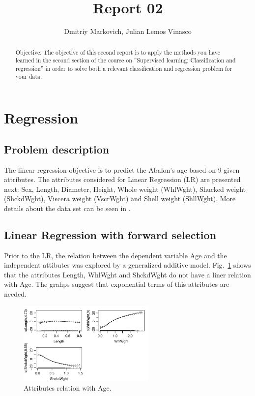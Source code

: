 \documentclass[10pt, paper=a4]{article}
\begin{document}
\title{Report 02}

\author{Dmitriy Markovich, Julian Lemos Vinasco}

\date{}

\maketitle

\begin{abstract}
  Objective: The objective of this second report is to apply the
  methods you have learned in the second section of the course on
  ”Supervised learning: Classification and regression” in order to
  solve both a relevant classification and regression problem for your
  data.
\end{abstract}

\section{Regression}
\label{sec:regression}

\subsection{Problem description}
The linear regression objective is to predict the Abalon's age based on 9 given attributes. The attributes considered for Linear Regression (LR) are presented next: Sex, Length, Diameter, Height, Whole weight (WhlWght), Shucked weight (ShckdWght), Viscera weight (VscrWght) and Shell weight (ShllWght). More details about the data set can be seen in \cite{datadescription}.

\subsection{Linear Regression with forward selection}
Prior to the LR, the relation between the dependent variable Age and the independent attibutes was explored by a generalized additive model. Fig.~\ref{fig:gam} shows that the attributes Length, WhlWght and ShckdWght do not have a liner relation with Age. The grahps suggest that exponential terms of this attributes are needed.

\begin{figure}[h]
  \centering
  \includegraphics[width = 0.60\textwidth]{gam.pdf}
  \caption{Attributes relation with Age.}
  \label{fig:gam}
\end{figure}
\end{document}
